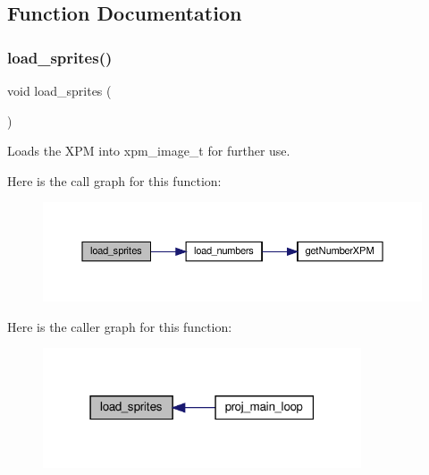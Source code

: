 \subsection{Function Documentation}
\mbox{\label{group__Main-Menu_ga26d3dd4d93472051b4e0bb50e319494b}} 
\subsubsection{\texorpdfstring{load\+\_\+sprites()}{load\_sprites()}}
{\footnotesize\ttfamily void load\+\_\+sprites (\begin{DoxyParamCaption}{ }\end{DoxyParamCaption})}



Loads the X\+PM into xpm\+\_\+image\+\_\+t for further use. 

Here is the call graph for this function\+:\nopagebreak
\begin{figure}[H]
\begin{center}
\leavevmode
\includegraphics[width=350pt]{group__Main-Menu_ga26d3dd4d93472051b4e0bb50e319494b_cgraph}
\end{center}
\end{figure}
Here is the caller graph for this function\+:\nopagebreak
\begin{figure}[H]
\begin{center}
\leavevmode
\includegraphics[width=267pt]{group__Main-Menu_ga26d3dd4d93472051b4e0bb50e319494b_icgraph}
\end{center}
\end{figure}
\mbox{\label{group__Main-Menu_gab084ce5f50d30f5b66396d4afa61f3a0}} 
